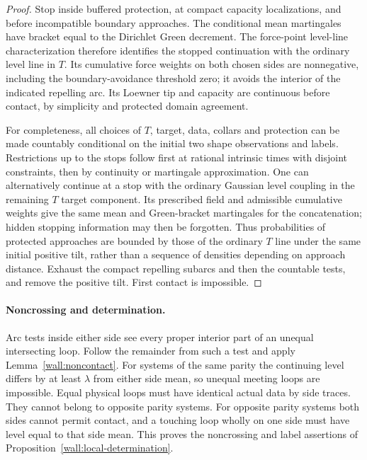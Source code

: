 \begin{proof}
Stop inside buffered protection, at compact capacity localizations, and before incompatible boundary approaches.  The conditional mean martingales have bracket equal to the Dirichlet Green decrement.  The force-point level-line characterization
\cite[Proposition~2.1.7]{WangWu} therefore identifies the stopped continuation
with the ordinary level line in $T$.  Its cumulative force weights on both chosen sides are nonnegative, including the boundary-avoidance threshold zero; it avoids the interior of the indicated repelling arc.  Its Loewner tip and capacity are continuous before contact, by simplicity and protected domain agreement.

For completeness, all choices of $T$, target, data, collars and protection can be made countably conditional on the initial two shape observations and labels.  Restrictions up to the stops follow first at rational intrinsic times with disjoint constraints, then by continuity or martingale approximation.  One can alternatively continue at a stop with the ordinary Gaussian level coupling in the remaining $T$ target component.  Its prescribed field and admissible cumulative weights give the same mean and Green-bracket martingales for the concatenation; hidden stopping information may then be forgotten.  Thus probabilities of protected approaches are bounded by those of the ordinary $T$ line under the same initial positive tilt, rather than a sequence of densities depending on approach distance.  Exhaust the compact repelling subarcs and then the countable tests, and remove the positive tilt.  First contact is impossible.
\end{proof}

\paragraph{Noncrossing and determination.}
Arc tests inside either side see every proper interior part of an unequal intersecting loop.  Follow the remainder from such a test and apply Lemma~\ref{wall:noncontact}.  For systems of the same parity the continuing level differs by at least $\lambda$ from either side mean, so unequal meeting loops are impossible.  Equal physical loops must have identical actual data by side traces.  They cannot belong to opposite parity systems.  For opposite parity systems both sides cannot permit contact, and a touching loop wholly on one side must have level equal to that side mean.  This proves the noncrossing and label assertions of Proposition~\ref{wall:local-determination}.

